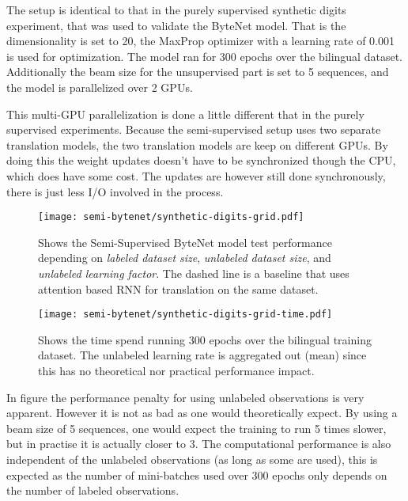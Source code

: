 The setup is identical to that in the purely supervised synthetic digits experiment, that was used to validate the ByteNet model. That is the dimensionality is set to 20, the MaxProp optimizer with a learning rate of 0.001 is used for optimization. The model ran for 300 epochs over the bilingual dataset. Additionally the beam size for the unsupervised part is set to 5 sequences, and the model is parallelized over 2 GPUs.

This multi-GPU parallelization is done a little different that in the purely supervised experiments. Because the semi-supervised setup uses two separate translation models, the two translation models are keep on different GPUs. By doing this the weight updates doesn't have to be synchronized though the CPU, which does have some cost. The updates are however still done synchronously, there is just less I/O involved in the process.

\begin{figure}[h]
    \centering
    \texttt{[image: semi-bytenet/synthetic-digits-grid.pdf]}
    \caption{Shows the Semi-Supervised ByteNet model test performance depending on \textit{labeled dataset size}, \textit{unlabeled dataset size}, and \textit{unlabeled learning factor}. The dashed line is a baseline that uses attention based RNN for translation on the same dataset.}
     \label{fig:result:semi-bytenet:missrate}
\end{figure}

\begin{figure}[h]
    \centering
    \texttt{[image: semi-bytenet/synthetic-digits-grid-time.pdf]}
    \caption{Shows the time spend running 300 epochs over the bilingual training dataset. The unlabeled learning rate is aggregated out (mean) since this has no theoretical nor practical performance impact.}
    \label{fig:result:semi-bytenet:time}
\end{figure}

In figure \label{fig:result:semi-bytenet:time} the performance penalty for using unlabeled observations is very apparent. However it is not as bad as one would theoretically expect. By using a beam size of 5 sequences, one would expect the training to run 5 times slower, but in practise it is actually closer to 3. The computational performance is also independent of the unlabeled observations (as long as some are used), this is expected as the number of mini-batches used over 300 epochs only depends on the number of labeled observations.

